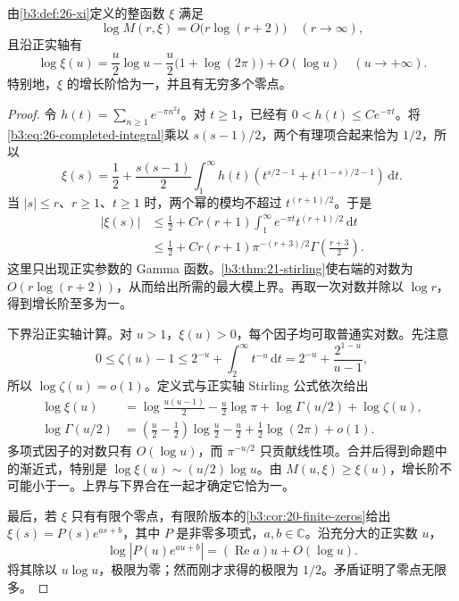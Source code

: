 \begin{proposition}[xi 函数的增长阶]\label{b3:prop:26-xi-order}
由\cref{b3:def:26-xi}定义的整函数 \(\xi\) 满足
\[
 \log M(r,\xi)=O\bigl(r\log(r+2)\bigr)\quad(r\to\infty),
\]
且沿正实轴有
\[
 \log\xi(u)=\frac u2\log u
       -\frac u2\bigl(1+\log(2\pi)\bigr)+O(\log u)
       \quad(u\to+\infty).
\]
特别地，\(\xi\) 的增长阶恰为一，并且有无穷多个零点。
\end{proposition}
\begin{proof}
令 \(h(t)=\sum_{n\ge1}e^{-\pi n^2t}\)。对 \(t\ge1\)，已经有 \(0<h(t)\le Ce^{-\pi t}\)。将\eqref{b3:eq:26-completed-integral}乘以 \(s(s-1)/2\)，两个有理项合起来恰为 \(1/2\)，所以
\begin{equation}\label{b3:eq:26-xi-integral}
 \xi(s)=\frac12+\frac{s(s-1)}2
 \int_1^\infty h(t)
       \left(t^{s/2-1}+t^{(1-s)/2-1}\right)\,\mathrm dt.
\end{equation}
当 \(|s|\le r\)、\(r\ge1\)、\(t\ge1\) 时，两个幂的模均不超过 \(t^{(r+1)/2}\)。于是
\[
 \begin{aligned}
 |\xi(s)|&\le\frac12+Cr(r+1)
              \int_1^\infty e^{-\pi t}t^{(r+1)/2}\,\mathrm dt\\
 &\le\frac12+Cr(r+1)\pi^{-(r+3)/2}
                           \Gamma\left(\frac{r+3}{2}\right).
 \end{aligned}
\]
这里只出现正实参数的 Gamma 函数。\cref{b3:thm:21-stirling}使右端的对数为 \(O(r\log(r+2))\)，从而给出所需的最大模上界。再取一次对数并除以 \(\log r\)，得到增长阶至多为一。

下界沿正实轴计算。对 \(u>1\)，\(\xi(u)>0\)，每个因子均可取普通实对数。先注意
\[
 0\le\zeta(u)-1\le 2^{-u}+\int_2^\infty t^{-u}\,\mathrm dt
       =2^{-u}+\frac{2^{1-u}}{u-1},
\]
所以 \(\log\zeta(u)=o(1)\)。定义式与正实轴 Stirling 公式依次给出
\[
 \begin{aligned}
 \log\xi(u)
 &=\log\frac{u(u-1)}2-\frac u2\log\pi
                       +\log\Gamma(u/2)+\log\zeta(u),\\
 \log\Gamma(u/2)
 &=\left(\frac u2-\frac12\right)\log\frac u2
                  -\frac u2+\frac12\log(2\pi)+o(1).
 \end{aligned}
\]
多项式因子的对数只有 \(O(\log u)\)，而 \(\pi^{-u/2}\) 只贡献线性项。合并后得到命题中的渐近式，特别是 \(\log\xi(u)\sim(u/2)\log u\)。由 \(M(u,\xi)\ge\xi(u)\)，增长阶不可能小于一。上界与下界合在一起才确定它恰为一。

最后，若 \(\xi\) 只有有限个零点，有限阶版本的\cref{b3:cor:20-finite-zeros}给出 \(\xi(s)=P(s)e^{as+b}\)，其中 \(P\) 是非零多项式，\(a,b\in\mathbb C\)。沿充分大的正实数 \(u\)，
\[
 \log|P(u)e^{au+b}|=(\operatorname{Re}a)u+O(\log u).
\]
将其除以 \(u\log u\)，极限为零；然而刚才求得的极限为 \(1/2\)。矛盾证明了零点无限多。
\end{proof}

